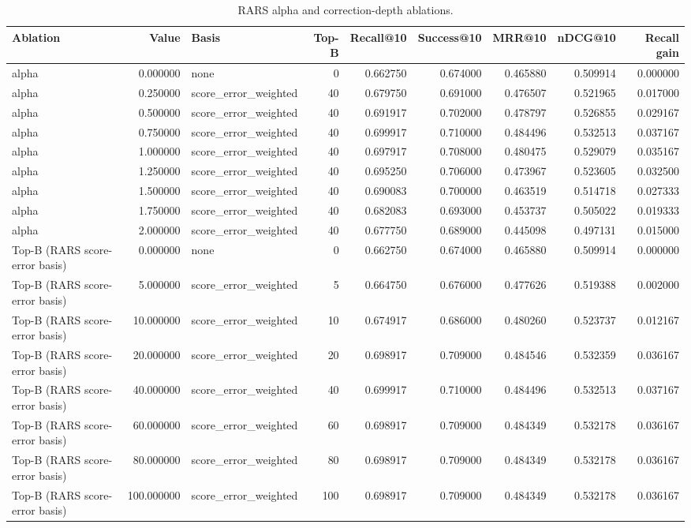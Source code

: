 \begin{table}[t]
\caption{RARS alpha and correction-depth ablations.}
\label{tab:rars-ablation}
\begin{tabular}{lrlrrrrrr}
\toprule
Ablation & Value & Basis & Top-B & Recall@10 & Success@10 & MRR@10 & nDCG@10 & Recall gain \\
\midrule
alpha & 0.000000 & none & 0 & 0.662750 & 0.674000 & 0.465880 & 0.509914 & 0.000000 \\
alpha & 0.250000 & score\_error\_weighted & 40 & 0.679750 & 0.691000 & 0.476507 & 0.521965 & 0.017000 \\
alpha & 0.500000 & score\_error\_weighted & 40 & 0.691917 & 0.702000 & 0.478797 & 0.526855 & 0.029167 \\
alpha & 0.750000 & score\_error\_weighted & 40 & 0.699917 & 0.710000 & 0.484496 & 0.532513 & 0.037167 \\
alpha & 1.000000 & score\_error\_weighted & 40 & 0.697917 & 0.708000 & 0.480475 & 0.529079 & 0.035167 \\
alpha & 1.250000 & score\_error\_weighted & 40 & 0.695250 & 0.706000 & 0.473967 & 0.523605 & 0.032500 \\
alpha & 1.500000 & score\_error\_weighted & 40 & 0.690083 & 0.700000 & 0.463519 & 0.514718 & 0.027333 \\
alpha & 1.750000 & score\_error\_weighted & 40 & 0.682083 & 0.693000 & 0.453737 & 0.505022 & 0.019333 \\
alpha & 2.000000 & score\_error\_weighted & 40 & 0.677750 & 0.689000 & 0.445098 & 0.497131 & 0.015000 \\
Top-B (RARS score-error basis) & 0.000000 & none & 0 & 0.662750 & 0.674000 & 0.465880 & 0.509914 & 0.000000 \\
Top-B (RARS score-error basis) & 5.000000 & score\_error\_weighted & 5 & 0.664750 & 0.676000 & 0.477626 & 0.519388 & 0.002000 \\
Top-B (RARS score-error basis) & 10.000000 & score\_error\_weighted & 10 & 0.674917 & 0.686000 & 0.480260 & 0.523737 & 0.012167 \\
Top-B (RARS score-error basis) & 20.000000 & score\_error\_weighted & 20 & 0.698917 & 0.709000 & 0.484546 & 0.532359 & 0.036167 \\
Top-B (RARS score-error basis) & 40.000000 & score\_error\_weighted & 40 & 0.699917 & 0.710000 & 0.484496 & 0.532513 & 0.037167 \\
Top-B (RARS score-error basis) & 60.000000 & score\_error\_weighted & 60 & 0.698917 & 0.709000 & 0.484349 & 0.532178 & 0.036167 \\
Top-B (RARS score-error basis) & 80.000000 & score\_error\_weighted & 80 & 0.698917 & 0.709000 & 0.484349 & 0.532178 & 0.036167 \\
Top-B (RARS score-error basis) & 100.000000 & score\_error\_weighted & 100 & 0.698917 & 0.709000 & 0.484349 & 0.532178 & 0.036167 \\
\bottomrule
\end{tabular}
\end{table}
